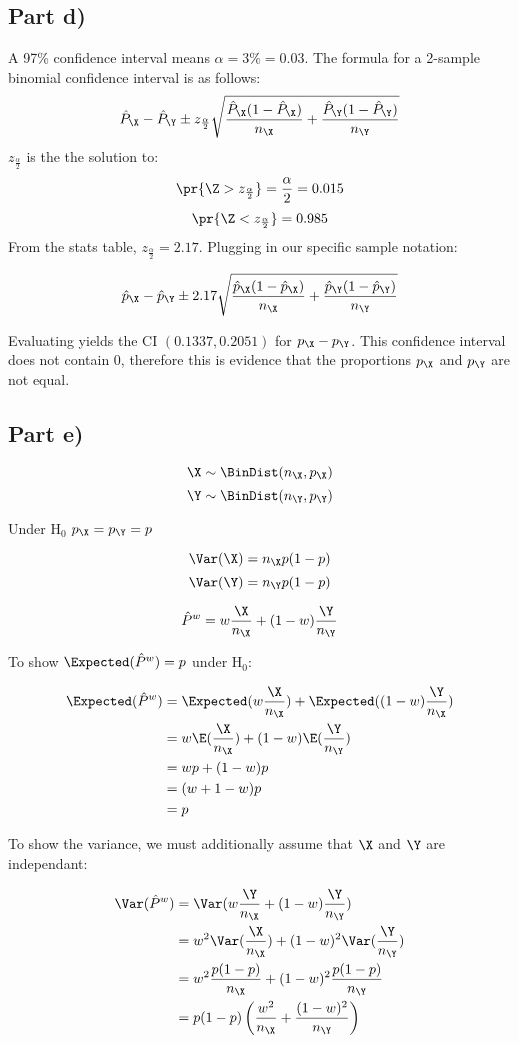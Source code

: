 \subsection{Part d)}

A 97\% confidence interval means $\alpha = 3\% = 0.03$. The formula for a 2-sample binomial confidence interval is as follows:
\[
\hat{P}_\X - \hat{P}_\Y \pm z_{\frac{\alpha}{2}} \sqrt{\frac{\hat{P}_\X(1 - \hat{P}_\X)}{n_\X} + \frac{\hat{P}_\Y(1 - \hat{P}_\Y)}{n_\Y}}
\]
$z_{\frac{\alpha}{2}}$ is the the solution to:
\[
\pr{\Z > z_{\frac{\alpha}{2}}} = \frac{\alpha}{2} = 0.015
\]
\[
\pr{\Z < z_{\frac{\alpha}{2}}} = 0.985
\]
From the stats table, $z_{\frac{\alpha}{2}} = 2.17$. Plugging in our specific sample notation:

\[
\hat{p}_\X - \hat{p}_\Y \pm 2.17 \sqrt{\frac{\hat{p}_\X(1 - \hat{p}_\X)}{n_\X} + \frac{\hat{p}_\Y(1 - \hat{p}_\Y)}{n_\Y}}
\]

Evaluating yields the CI $(0.1337, 0.2051)$ for $p_\X - p_\Y$.
This confidence interval does not contain 0, therefore this is evidence that the proportions $p_\X$ and $p_\Y$ are not equal.

\subsection{Part e)}
\[
\X \sim \BinDist (n_\X, p_\X)
\]
\[
\Y \sim \BinDist (n_\Y, p_\Y)
\]

Under $\text{H}_0$ $p_\X = p_\Y = p$

\[
\Var(\X) = n_\X p (1 - p)
\]
\[
\Var(\Y) = n_\Y p (1 - p)
\]

\[
\hat{P}^w = w \frac{\X}{n_\X} + (1 - w)\frac{\Y}{n_\Y}
\]

To show $\Expected(\hat{P}^w) = p$ under $\text{H}_0$:

\begin{align*}
\Expected(\hat{P}^w) &= \Expected(w\frac{\X}{n_\X}) + \Expected((1-w)\frac{\Y}{n_\X}) \\
&= w \E(\frac{\X}{n_\X}) + (1-w)\E(\frac{\Y}{n_\Y}) \\
&= wp + (1-w)p \\
&= (w + 1 - w)p \\
&= p
\end{align*}

To show the variance, we must additionally assume that $\X$ and $\Y$ are independant:

\begin{align*}
\Var(\hat{P}^w) &= \Var(w \frac{\Y}{n_\X} + (1-w)\frac{\Y}{n_\Y}) \\
&= w^2 \Var(\frac{\X}{n_\X}) + (1-w)^2 \Var(\frac{\Y}{n_\Y}) \\
&= w^2 \frac{p(1-p)}{n_\X} + (1-w)^2 \frac{p(1-p)}{n_\Y} \\
&= p(1-p)\left( \frac{w^2}{n_\X} + \frac{(1-w)^2}{n_\Y} \right)
\end{align*}


